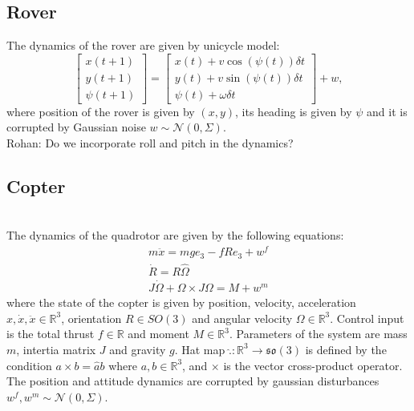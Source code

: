 \documentclass[conference]{IEEEtran}
\newcommand{\rohan}[1]{{\color{blue} Rohan: #1}}
\begin{document}
\subsection{Rover }
The dynamics of the rover are given by unicycle model:
\begin{equation}
    \begin{bmatrix}
        x(t+1) \\
        y(t+1) \\
        \psi(t+1)
    \end{bmatrix} = \begin{bmatrix}x(t) + v \cos(\psi(t)) \delta{t}\\ y(t) + v \sin(\psi(t)) \delta{t}\\ \psi(t) + \omega \delta{t} \end{bmatrix} + w,
\end{equation}
where position of the rover is given by $(x,y)$, its heading is given by $\psi$ and it is corrupted by Gaussian noise $w \sim \mathcal{N}(0,\Sigma)$. \\
\rohan{Do we incorporate roll and pitch in the dynamics?}

\subsection{Copter}
 \\
The dynamics of the quadrotor are given by the following equations:
\begin{gather}
m\ddot{x} = mge_{3} - fRe_{3} + w^f\\
\dot{R} = R\hat{\Omega} \\
J\dot{\Omega} + \Omega \times J\Omega = M + w^m
\end{gather}
where the state of the copter is given by position, velocity, acceleration $x, \dot{x}, \ddot{x} \in \mathbb{R}^3$, orientation $R \in SO(3)$ and angular velocity $\Omega \in \mathbb{R}^3$.
Control input is the total thrust $f \in \mathbb{R}$ and moment $M \in \mathbb{R}^3$.
Parameters of the system are mass $m$, intertia matrix $J$ and gravity $g$.
Hat map $\hat{.}: \mathbb{R}^3 \to \mathfrak{so}(3)$ is defined by the condition $a \times b = \hat{a}b$ where $a,b\in \mathbb{R}^3$, and $\times$ is the vector cross-product operator. The position and attitude dynamics are corrupted by gaussian disturbances  $w^f, w^m \sim \mathcal{N}(0,\Sigma)$. \\
\end{document}
